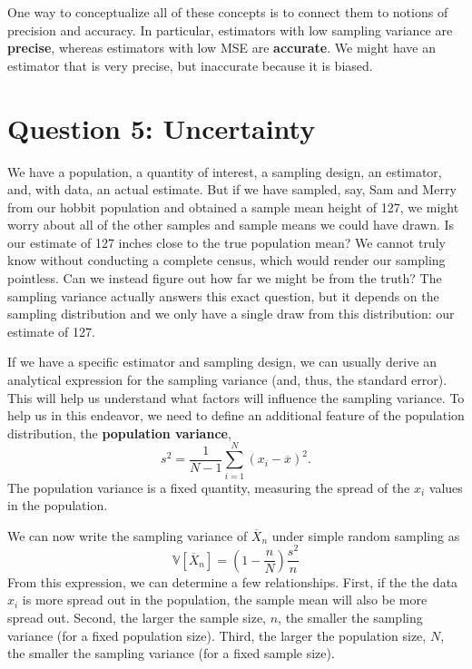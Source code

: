 \documentclass[
  letterpaper,
  DIV=11,
  numbers=noendperiod]{scrreprt}
\newcommand{\V}{\mathbb{V}}
\newcommand{\Xbar}{\overline{X}}
\theoremstyle{definition}
\theoremstyle{definition}
\theoremstyle{plain}
\theoremstyle{remark}
\begin{document}
One way to conceptualize all of these concepts is to connect them to
notions of precision and accuracy. In particular, estimators with low
sampling variance are \textbf{precise}, whereas estimators with low MSE
are \textbf{accurate}. We might have an estimator that is very precise,
but inaccurate because it is biased.

\hypertarget{question-5-uncertainty}{%
\section{Question 5: Uncertainty}\label{question-5-uncertainty}}

We have a population, a quantity of interest, a sampling design, an
estimator, and, with data, an actual estimate. But if we have sampled,
say, Sam and Merry from our hobbit population and obtained a sample mean
height of 127, we might worry about all of the other samples and sample
means we could have drawn. Is our estimate of 127 inches close to the
true population mean? We cannot truly know without conducting a complete
census, which would render our sampling pointless. Can we instead figure
out how far we might be from the truth? The sampling variance actually
answers this exact question, but it depends on the sampling distribution
and we only have a single draw from this distribution: our estimate of
127.

If we have a specific estimator and sampling design, we can usually
derive an analytical expression for the sampling variance (and, thus,
the standard error). This will help us understand what factors will
influence the sampling variance. To help us in this endeavor, we need to
define an additional feature of the population distribution, the
\textbf{population variance}, \[
s^{2}= \frac{1}{N-1} \sum_{i=1}^{N} (x_{i} - \overline{x})^{2}.
\] The population variance is a fixed quantity, measuring the spread of
the \(x_i\) values in the population.

We can now write the sampling variance of \(\Xbar_n\) under simple
random sampling as \[
\V[\Xbar_{n}] = \left(1 - \frac{n}{N}\right) \frac{s^{2}}{n}
\] From this expression, we can determine a few relationships. First, if
the the data \(x_i\) is more spread out in the population, the sample
mean will also be more spread out. Second, the larger the sample size,
\(n\), the smaller the sampling variance (for a fixed population size).
Third, the larger the population size, \(N\), the smaller the sampling
variance (for a fixed sample size).
\end{document}
